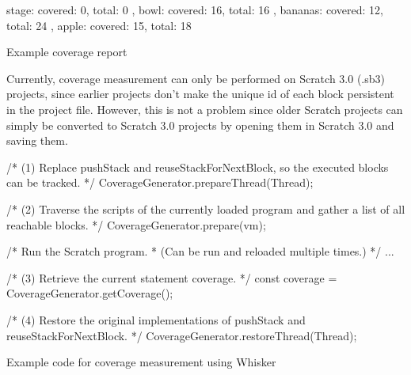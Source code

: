 \begin{listing}[htpb]
    \centering

    \begin{minipage}{.5\textwidth}
        \begin{javascriptcode}
              { stage: { covered: 0, total: 0 },
                bowl: { covered: 16, total: 16 },
                bananas: { covered: 12, total: 24 },
                apple: { covered: 15, total: 18 } }
        \end{javascriptcode}
    \end{minipage}

    \caption{Example coverage report}
    \label{fig:example_coverage_report}
\end{listing}

Currently, coverage measurement can only be performed on Scratch 3.0 (.sb3) projects,
since earlier projects don't make the unique id of each block persistent in the project file.
However, this is not a problem since older Scratch projects can simply be converted to Scratch 3.0 projects by
opening them in Scratch 3.0 and saving them.
\parspace

\begin{listing}[htpb]
    \centering

    \begin{minipage}{.75\textwidth}
        \begin{javascriptcode}
            /* (1) Replace pushStack and reuseStackForNextBlock,
               so the executed blocks can be tracked. */
            CoverageGenerator.prepareThread(Thread);

            /* (2) Traverse the scripts of the currently loaded program
               and gather a list of all reachable blocks. */
            CoverageGenerator.prepare(vm);

            /* Run the Scratch program.
            * (Can be run and reloaded multiple times.) */
            ...

            /* (3) Retrieve the current statement coverage. */
            const coverage = CoverageGenerator.getCoverage();

            /* (4) Restore the original implementations of pushStack and
               reuseStackForNextBlock. */
            CoverageGenerator.restoreThread(Thread);
        \end{javascriptcode}
    \end{minipage}

    \caption{Example code for coverage measurement using Whisker}
    \label{fig:measuring_coverage}
\end{listing}

